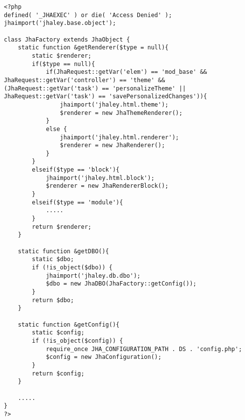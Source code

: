 \begin{lstlisting}[label=factory_method,caption=Clase Factory Method]
<?php 
defined( '_JHAEXEC' ) or die( 'Access Denied' );
jhaimport('jhaley.base.object');

class JhaFactory extends JhaObject {
    static function &getRenderer($type = null){
        static $renderer;
       	if($type == null){
       		if(JhaRequest::getVar('elem') == 'mod_base' && JhaRequest::getVar('controller') == 'theme' && (JhaRequest::getVar('task') == 'personalizeTheme' || JhaRequest::getVar('task') == 'savePersonalizedChanges')){
       			jhaimport('jhaley.html.theme'); 
	            $renderer = new JhaThemeRenderer();
       		}
       		else {
	            jhaimport('jhaley.html.renderer'); 
	            $renderer = new JhaRenderer();
       		}
       	}
       	elseif($type == 'block'){
       		jhaimport('jhaley.html.block'); 
            $renderer = new JhaRendererBlock();
       	}
       	elseif($type == 'module'){
            .....
        }
        return $renderer;
    }
    
	static function &getDBO(){
        static $dbo;
        if (!is_object($dbo)) {
            jhaimport('jhaley.db.dbo');             
            $dbo = new JhaDBO(JhaFactory::getConfig());
        }
        return $dbo;
    }
    
	static function &getConfig(){
        static $config;
        if (!is_object($config)) {
            require_once JHA_CONFIGURATION_PATH . DS . 'config.php'; 
            $config = new JhaConfiguration();
        }
        return $config;
    }

	.....
}
?>
\end{lstlisting}
